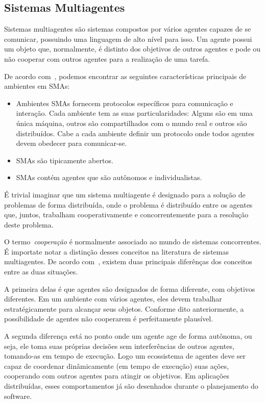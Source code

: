 \subsection{Sistemas Multiagentes}

Sistemas multiagentes são sistemas compostos por vários agentes capazes de se comunicar, possuindo uma linguagem de alto nível para isso. Um agente possui um objeto que, normalmente, é distinto dos objetivos de outros agentes e pode ou não cooperar com outros agentes para a realização de uma tarefa.

De acordo com~\cite{sarmento11}, podemos encontrar as seguintes características principais de ambientes em SMAs:
\begin{itemize}
	\item Ambientes SMAs fornecem protocolos específicos para comunicação e interação. Cada ambiente tem as suas particularidades: Alguns são em uma única máquina, outros são compartilhados com o mundo real e outros são distribuídos. Cabe a cada ambiente definir um protocolo onde todos agentes devem obedecer para comunicar-se.
	\item SMAs são tipicamente abertos.
	\item SMAs contém agentes que são autônomos e individualistas.
\end{itemize}

É trivial imaginar que um sistema multiagente é designado para a solução de problemas de forma distribuída, onde o problema é distribuído entre os agentes que, juntos, trabalham cooperativamente e concorrentemente para a resolução deste problema.

O termo~\emph{cooperação} é normalmente associado ao mundo de sistemas concorrentes. É importate notar a distinção desses conceitos na literatura de sistemas multiagentes. De acordo com~\cite{wooldridge04}, existem duas principais diferênças dos conceitos entre as duas situações.

A primeira delas é que agentes são designados de forma diferente, com objetivos diferentes. Em um ambiente com vários agentes, eles devem trabalhar estratégicamente para alcançar seus objetos. Conforme dito anteriormente, a possibilidade de agentes não cooperarem é perfeitamente plausível.

A segunda diferença está no ponto onde um agente age de forma autônoma, ou seja, ele toma suas próprias decisões sem interferências de outros agentes, tomando-as em tempo de execução. Logo um ecossistema de agentes deve ser capaz de coordenar dinâmicamente (em tempo de execução) suas ações, cooperando com outros agentes para atingir os objetivos. Em aplicações distribuídas, esses comportamentos já são desenhados durante o planejamento do software.

